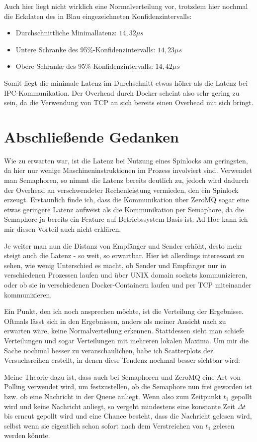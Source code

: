 \documentclass[12pt]{article}
\begin{document}
Auch hier liegt nicht wirklich eine Normalverteilung vor, trotzdem hier nochmal die Eckdaten des in Blau eingezeichneten Konfidenzintervalls:

\begin{itemize}
	\item Durchschnittliche Minimallatenz: $14,32 \mu s$
	\item Untere Schranke des 95\%-Konfidenzintervalls: $14,23 \mu s$
	\item Obere Schranke des 95\%-Konfidenzintervalls: $14,42 \mu s$
\end{itemize}

Somit liegt die minimale Latenz im Durchschnitt etwas höher als die Latenz bei IPC-Kommunikation. 
Der Overhead durch Docker scheint also sehr gering zu sein, da die Verwendung von TCP an sich bereits einen Overhead mit sich bringt.

\section{Abschließende Gedanken}
Wie zu erwarten war, ist die Latenz bei Nutzung eines Spinlocks am geringsten, da hier nur wenige Maschineninstruktionen im Prozess involviert sind.
Verwendet man Semaphoren, so nimmt die Latenz bereits deutlich zu, jedoch wird dadurch der Overhead an verschwendeter Rechenleistung vermieden, den ein Spinlock erzeugt.
Erstaunlich finde ich, dass die Kommunikation über ZeroMQ sogar eine etwas geringere Latenz aufweist als die Kommunikation per Semaphore, da die Semaphore ja bereits ein Feature auf Betriebssystem-Basis ist.
Ad-Hoc kann ich mir diesen Vorteil auch nicht erklären.

Je weiter man nun die Distanz von Empfänger und Sender erhöht, desto mehr steigt auch die Latenz - so weit, so erwartbar.
Hier ist allerdings interessant zu sehen, wie wenig Unterschied es macht, ob Sender und Empfänger nur in verschiedenen Prozessen laufen und über UNIX domain sockets kommunizieren, oder ob sie in verschiedenen Docker-Containern laufen und per TCP miteinander kommunizieren.

Ein Punkt, den ich noch ansprechen möchte, ist die Verteilung der Ergebnisse. 
Oftmals lässt sich in den Ergebnissen, anders als meiner Ansicht nach zu erwarten wäre, keine Normalverteilung erkennen. 
Stattdessen sieht man schiefe Verteilungen und sogar Verteilungen mit mehreren lokalen Maxima.
Um mir die Sache nochmal besser zu veranschaulichen, habe ich Scatterplots der Versuchsreihen erstellt, in denen diese Tendenz nochmal besser sichtbar wird:


Meine Theorie dazu ist, dass auch bei Semaphoren und ZeroMQ eine Art von Polling verwendet wird, um festzustellen, ob die Semaphore nun frei geworden ist bzw. ob eine Nachricht in der Queue anliegt.
Wenn also zum Zeitpunkt $t_1$ gepollt wird und keine Nachricht anliegt, so vergeht mindestens eine konstante Zeit $\Delta t$ bis erneut gepollt wird und eine Chance besteht, dass die Nachricht gelesen wird, selbst wenn sie eigentlich schon sofort nach dem Verstreichen von $t_1$ gelesen werden könnte.
\end{document}
